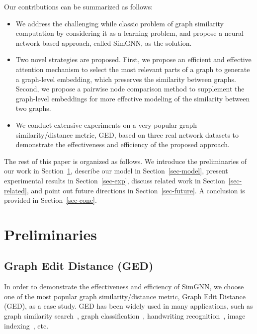 \documentclass[sigconf]{acmart}
\begin{document}
Our contributions can be summarized as follows:
\vspace{-\topsep}
\begin{itemize}
\item We address the challenging while classic problem of graph similarity computation by considering it as a learning problem, and propose a neural network based approach, called SimGNN, as the solution.
\item Two novel strategies are proposed. First, we propose an efficient and effective attention mechanism to select the most relevant parts of a graph to generate a graph-level embedding, which preserves the similarity between graphs. Second, we propose a pairwise node comparison method to supplement the graph-level embeddings for more effective modeling of the similarity between two graphs.
\item We conduct extensive experiments on a very popular graph similarity/distance metric, GED,  based on three real network datasets to demonstrate the effectiveness and efficiency of the proposed approach.
\end{itemize}

The rest of this paper is organized as follows. We introduce the preliminaries of our work in Section~\ref{sec-prelim}, describe our model in Section~\ref{sec-model}, present experimental results in Section~\ref{sec-exp}, discuss related work in Section~\ref{sec-related}, and point out future directions in Section~\ref{sec-future}. A conclusion is provided in Section~\ref{sec-conc}.











 \section{Preliminaries}
\label{sec-prelim}
\subsection{Graph Edit Distance (GED)}
In order to demonstrate the effectiveness and efficiency of SimGNN, we choose one of the most popular graph similarity/distance metric, Graph Edit Distance (GED), as a case study.  GED has been widely used in many applications, such as graph similarity search~\cite{zeng2009comparing,wang2012efficient,zheng2013graph,zhao2013partition,liang2017similarity}, graph classification~\cite{riesen2008iam,riesen2009approximate}, handwriting recognition~\cite{fischer2013fast}, image indexing~\cite{xiao2008hmm}, etc. 
\end{document}
